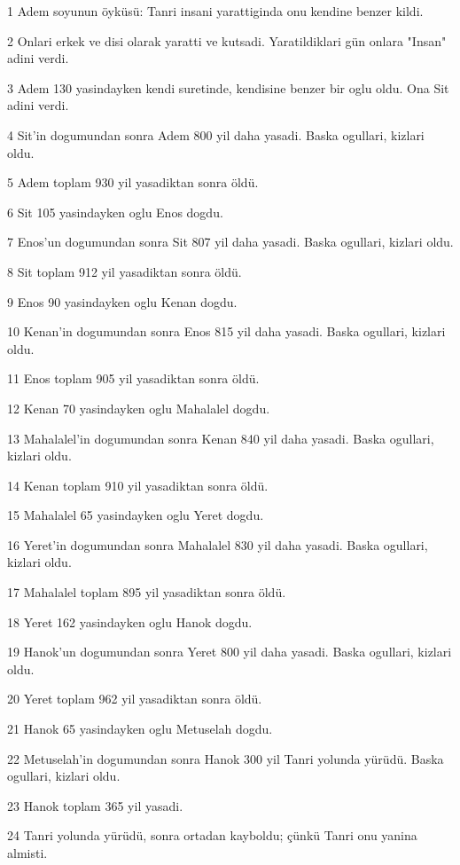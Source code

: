 \par 1 Adem soyunun öyküsü: Tanri insani yarattiginda onu kendine benzer kildi.
\par 2 Onlari erkek ve disi olarak yaratti ve kutsadi. Yaratildiklari gün onlara "Insan" adini verdi.
\par 3 Adem 130 yasindayken kendi suretinde, kendisine benzer bir oglu oldu. Ona Sit adini verdi.
\par 4 Sit'in dogumundan sonra Adem 800 yil daha yasadi. Baska ogullari, kizlari oldu.
\par 5 Adem toplam 930 yil yasadiktan sonra öldü.
\par 6 Sit 105 yasindayken oglu Enos dogdu.
\par 7 Enos'un dogumundan sonra Sit 807 yil daha yasadi. Baska ogullari, kizlari oldu.
\par 8 Sit toplam 912 yil yasadiktan sonra öldü.
\par 9 Enos 90 yasindayken oglu Kenan dogdu.
\par 10 Kenan'in dogumundan sonra Enos 815 yil daha yasadi. Baska ogullari, kizlari oldu.
\par 11 Enos toplam 905 yil yasadiktan sonra öldü.
\par 12 Kenan 70 yasindayken oglu Mahalalel dogdu.
\par 13 Mahalalel'in dogumundan sonra Kenan 840 yil daha yasadi. Baska ogullari, kizlari oldu.
\par 14 Kenan toplam 910 yil yasadiktan sonra öldü.
\par 15 Mahalalel 65 yasindayken oglu Yeret dogdu.
\par 16 Yeret'in dogumundan sonra Mahalalel 830 yil daha yasadi. Baska ogullari, kizlari oldu.
\par 17 Mahalalel toplam 895 yil yasadiktan sonra öldü.
\par 18 Yeret 162 yasindayken oglu Hanok dogdu.
\par 19 Hanok'un dogumundan sonra Yeret 800 yil daha yasadi. Baska ogullari, kizlari oldu.
\par 20 Yeret toplam 962 yil yasadiktan sonra öldü.
\par 21 Hanok 65 yasindayken oglu Metuselah dogdu.
\par 22 Metuselah'in dogumundan sonra Hanok 300 yil Tanri yolunda yürüdü. Baska ogullari, kizlari oldu.
\par 23 Hanok toplam 365 yil yasadi.
\par 24 Tanri yolunda yürüdü, sonra ortadan kayboldu; çünkü Tanri onu yanina almisti.
